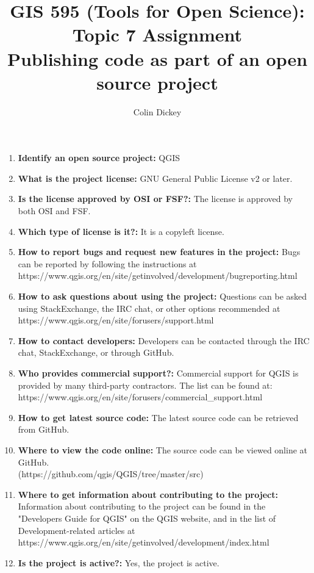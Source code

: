 \documentclass{article}
\begin{document}
\author{Colin Dickey}
\title{GIS 595 (Tools for Open Science): Topic 7 Assignment \\ \large \medskip
Publishing code as part of an open source project}
\maketitle

\medskip


\begin{enumerate}
\item \textbf{Identify an open source project:} QGIS
\item \textbf{What is the project license:} GNU General Public License v2 or later.

\item \textbf{Is the license approved by OSI or FSF?:} The license is approved by both OSI and FSF.
\item \textbf{Which type of license is it?:} It is a copyleft license.
\item \textbf{How to report bugs and request new features in the project:} Bugs can be reported by following the instructions at https://www.qgis.org/en/site/getinvolved/development/bugreporting.html
\item \textbf{How to ask questions about using the project:} Questions can be asked using StackExchange, the IRC chat, or other options recommended at https://www.qgis.org/en/site/forusers/support.html
\item \textbf{How to contact developers:} Developers can be contacted through the IRC chat, StackExchange, or through GitHub. 
\item \textbf{Who provides commercial support?:} Commercial support for QGIS is provided by many third-party contractors. The list can be found at: https://www.qgis.org/en/site/forusers/commercial\_support.html
\item \textbf{How to get latest source code:} The latest source code can be retrieved from GitHub.
\item \textbf{Where to view the code online:} The source code can be viewed online at GitHub. \\ (https://github.com/qgis/QGIS/tree/master/src)
\item \textbf{Where to get information about contributing to the project:} Information about contributing to the project can be found in the "Developers Guide for QGIS" on the QGIS website, and in the list of Development-related articles at https://www.qgis.org/en/site/getinvolved/development/index.html
\item \textbf{Is the project is active?:} Yes, the project is active.

\end{enumerate}
\end{document}
